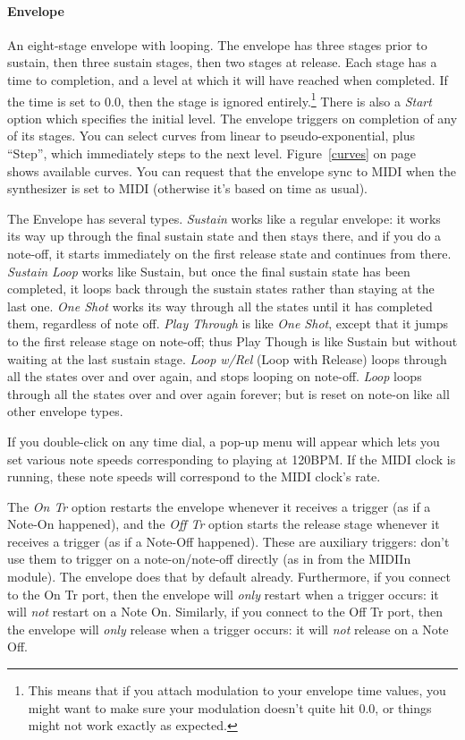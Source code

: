 \documentclass{article}
\begin{document}
\paragraph{Envelope}  An eight-stage envelope with looping.  The envelope has three stages prior to sustain, then three sustain stages, then two stages at release.  Each stage has a time to completion, and a level at which it will have reached when completed.  If the time is set to 0.0, then the stage is ignored entirely.\footnote{This means that if you attach modulation to your envelope time values, you might want to make sure your modulation doesn't quite hit 0.0, or things might not work exactly as expected.}  There is also a {\it Start} option which specifies the initial level.  The envelope triggers on completion of any of its stages.  You can select curves from linear to pseudo-exponential, plus ``Step'', which immediately steps to the next level.  Figure~\ref{curves} on page~\pageref{curves} shows available curves.  You can request that the envelope sync to MIDI when the synthesizer is set to MIDI (otherwise it's based on time as usual). 

The Envelope has several types.  {\it Sustain} works like a regular envelope: it works its way up through the final sustain state and then stays there, and if you do a note-off, it starts immediately on the first release state and continues from there.  {\it Sustain Loop} works like Sustain, but once the final sustain state has been completed, it loops back through the sustain states rather than staying at the last one.  {\it One Shot} works its way through all the states until  it has completed them, regardless of note off.  {\it Play Through} is like {\it One Shot}, except that it jumps to the first release stage on note-off; thus Play Though is like Sustain but without waiting at the last sustain stage.  {\it Loop w/Rel} (Loop with Release) loops through all the states over and over again, and stops looping on note-off.  {\it Loop} loops through all the states over and over again forever; but is reset on note-on like all other envelope types.
   
If you double-click on any time dial, a pop-up menu will appear which lets you set various note speeds corresponding to playing at 120BPM.  If the MIDI clock is running, these note speeds will correspond to the MIDI clock's rate.

The {\it On Tr} option restarts the envelope whenever it receives a trigger (as if a Note-On happened), and the {\it Off Tr} option starts the release stage whenever it receives a trigger (as if a Note-Off happened).  These are auxiliary triggers: don't use them to trigger on a note-on/note-off directly (as in from the MIDIIn module).  The envelope does that by default already.  Furthermore, if you connect to the On Tr port, then the envelope will {\it only} restart when a trigger occurs: it will {\it not} restart on a Note On.  Similarly, if you connect to the Off Tr port, then the envelope will {\it only} release when a trigger occurs: it will {\it not} release on a Note Off.   
\end{document}
